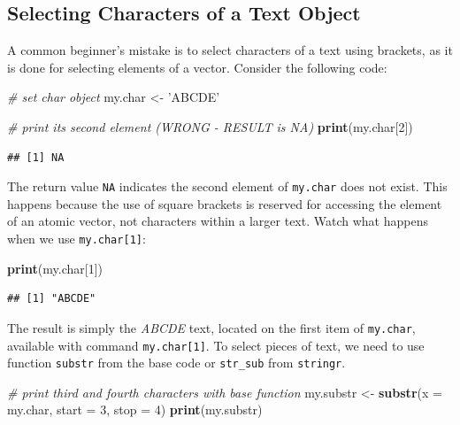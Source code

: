 \documentclass[11pt,]{book}
\newenvironment{Shaded}{\begin{snugshade}}{\end{snugshade}}
\newcommand{\KeywordTok}[1]{\textcolor[rgb]{0.27,0.27,0.27}{\textbf{#1}}}
\newcommand{\DataTypeTok}[1]{\textcolor[rgb]{0.27,0.27,0.27}{#1}}
\newcommand{\DecValTok}[1]{\textcolor[rgb]{0.06,0.06,0.06}{#1}}
\newcommand{\StringTok}[1]{\textcolor[rgb]{0.5,0.5,0.5}{#1}}
\newcommand{\CommentTok}[1]{\textcolor[rgb]{0.56,0.35,0.01}{\textit{#1}}}
\newcommand{\NormalTok}[1]{#1}
\begin{document}
\subsection{Selecting Characters of a Text
Object}\label{selecting-characters-of-a-text-object}

A common beginner's mistake is to select characters of a text using
brackets, as it is done for selecting elements of a vector. Consider the
following code:

\begin{Shaded}
\begin{Highlighting}[]
\CommentTok{# set char object}
\NormalTok{my.char <-}\StringTok{ 'ABCDE'}

\CommentTok{# print its second element (WRONG - RESULT is NA)}
\KeywordTok{print}\NormalTok{(my.char[}\DecValTok{2}\NormalTok{])}
\end{Highlighting}
\end{Shaded}

\begin{verbatim}
## [1] NA
\end{verbatim}

The return value \texttt{NA} indicates the second element of
\texttt{my.char} does not exist. This happens because the use of square
brackets is reserved for accessing the element of an atomic vector, not
characters within a larger text. Watch what happens when we use
\texttt{my.char{[}1{]}}:

\begin{Shaded}
\begin{Highlighting}[]
\KeywordTok{print}\NormalTok{(my.char[}\DecValTok{1}\NormalTok{])}
\end{Highlighting}
\end{Shaded}

\begin{verbatim}
## [1] "ABCDE"
\end{verbatim}

The result is simply the \emph{ABCDE} text, located on the first item of
\texttt{my.char}, available with command \texttt{my.char{[}1{]}}. To
select pieces of text, we need to use function \texttt{substr} from the
base code or \texttt{str\_sub} from \texttt{stringr}.
 

\begin{Shaded}
\begin{Highlighting}[]
\CommentTok{# print third and fourth characters with base function}
\NormalTok{my.substr <-}\StringTok{ }\KeywordTok{substr}\NormalTok{(}\DataTypeTok{x =}\NormalTok{ my.char, }\DataTypeTok{start =} \DecValTok{3}\NormalTok{, }\DataTypeTok{stop =} \DecValTok{4}\NormalTok{)}
\KeywordTok{print}\NormalTok{(my.substr)}
\end{Highlighting}
\end{Shaded}
\end{document}
